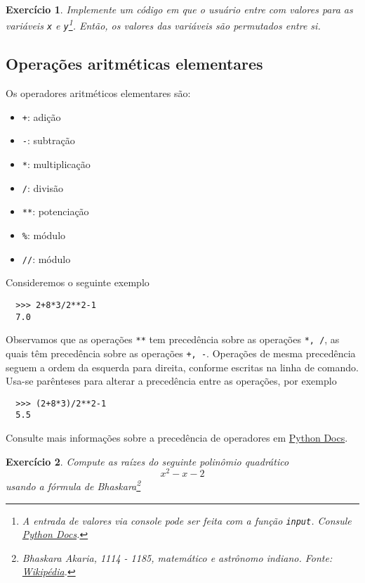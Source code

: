 \documentclass[12pt]{article}
\newtheorem{exr}{Exercício}[section]
\begin{document}
\begin{exr}
  Implemente um código em que o usuário entre com valores para as variáveis \lstinline+x+ e \lstinline+y+\footnote{A entrada de valores via console pode ser feita com a função {\python} \lstinline+input+. Consule \href{https://docs.python.org/3/library/functions.html\#input}{Python Docs}.}. Então, os valores das variáveis são permutados entre si.
\end{exr}


\subsection{Operações aritméticas elementares}

Os operadores aritméticos elementares são:
\begin{itemize}
\item[]\lstinline-+-: adição
\item[]\lstinline+-+: subtração
\item[]\lstinline+*+: multiplicação
\item[]\lstinline+/+: divisão
\item[]\lstinline+**+: potenciação
\item[]\lstinline+%+: módulo
\item[]\lstinline+//+: módulo
\end{itemize}

Consideremos o seguinte exemplo
\begin{lstlisting}
  >>> 2+8*3/2**2-1
  7.0
\end{lstlisting}
Observamos que as operações \lstinline+**+ tem precedência sobre as operações \lstinline+*, /+, as quais têm precedência sobre as operações \lstinline!+, -!. Operações de mesma precedência seguem a ordem da esquerda para direita, conforme escritas na linha de comando. Usa-se parênteses para alterar a precedência entre as operações, por exemplo
\begin{lstlisting}
  >>> (2+8*3)/2**2-1
  5.5
\end{lstlisting}
Consulte mais informações sobre a precedência de operadores em \href{https://docs.python.org/3/reference/expressions.html#operator-precedence}{Python Docs}.

\begin{exr}
  Compute as raízes do seguinte polinômio quadrático
  \begin{equation}
    x^2 - x - 2
  \end{equation}
  usando a fórmula de Bhaskara\footnote{Bhaskara Akaria, 1114 - 1185, matemático e astrônomo indiano. Fonte: \href{https://pt.wikipedia.org/wiki/Bhaskara\_II}{Wikipédia}.}
\end{exr}
\end{document}

